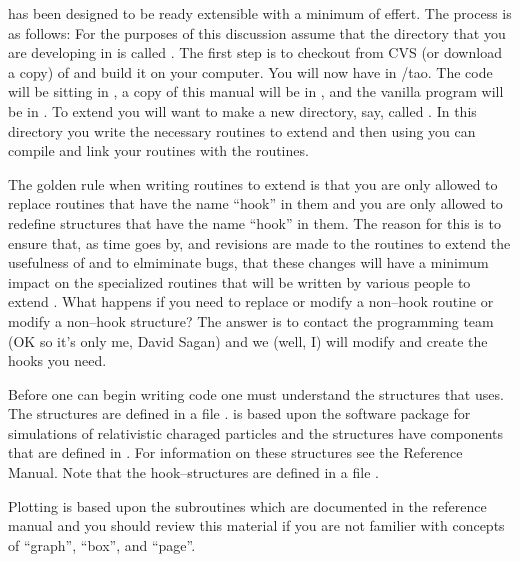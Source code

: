 
\tao has been designed to be ready extensible with a minimum of
effert.  The process is as follows: For the purposes of this
discussion assume that the directory that you are developing \tao in
is called . The first step is to checkout from CVS (or download a
copy) of \tao and build it on your computer. You will now have \tao in
/tao. The code will be sitting in , a copy of this
manual will be in , and the vanilla \tao program will be
in . To extend \tao you will want to make a new
directory, say, called . In this directory you write
the necessary routines to extend \tao and then using  you
can compile and link your routines with the \tao routines.

The golden rule when writing routines to extend \tao is that you are
only allowed to replace routines that have the name ``hook'' in them
and you are only allowed to redefine structures that have the name
``hook'' in them. The reason for this is to ensure that, as time goes
by, and revisions are made to the \tao routines to extend the
usefulness of \tao and to elmiminate bugs, that these changes will
have a minimum impact on the specialized routines that will be written
by various people to extend \tao.  What happens if you need to replace
or modify a non--hook routine or modify a non--hook structure?  The
answer is to contact the \tao programming team (OK so it's only me,
David Sagan) and we (well, I) will modify \tao and create the hooks
you need.


Before one can begin writing code one must understand the structures
that \tao uses. The structures are defined in a file . 
\tao is based upon the \bmad software package for simulations of 
relativistic charaged particles and the \tao structures have components
that are defined in \bmad. For information on these structures see the \bmad
Reference Manual. Note that the hook--structures are defined in a file
.


Plotting is based upon the  subroutines which are
documented in the \bmad reference manual and you should review this
material if you are not familier with concepts of ``graph'', ``box'',
and ``page''. 


